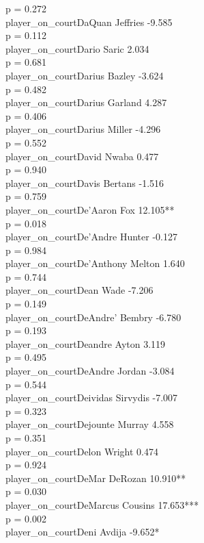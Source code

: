 \documentclass[
  landscape]{article}
\begin{document}
p = 0.272\\
player\_on\_courtDaQuan Jeffries -9.585\\
p = 0.112\\
player\_on\_courtDario Saric 2.034\\
p = 0.681\\
player\_on\_courtDarius Bazley -3.624\\
p = 0.482\\
player\_on\_courtDarius Garland 4.287\\
p = 0.406\\
player\_on\_courtDarius Miller -4.296\\
p = 0.552\\
player\_on\_courtDavid Nwaba 0.477\\
p = 0.940\\
player\_on\_courtDavis Bertans -1.516\\
p = 0.759\\
player\_on\_courtDe'Aaron Fox 12.105**\\
p = 0.018\\
player\_on\_courtDe'Andre Hunter -0.127\\
p = 0.984\\
player\_on\_courtDe'Anthony Melton 1.640\\
p = 0.744\\
player\_on\_courtDean Wade -7.206\\
p = 0.149\\
player\_on\_courtDeAndre' Bembry -6.780\\
p = 0.193\\
player\_on\_courtDeandre Ayton 3.119\\
p = 0.495\\
player\_on\_courtDeAndre Jordan -3.084\\
p = 0.544\\
player\_on\_courtDeividas Sirvydis -7.007\\
p = 0.323\\
player\_on\_courtDejounte Murray 4.558\\
p = 0.351\\
player\_on\_courtDelon Wright 0.474\\
p = 0.924\\
player\_on\_courtDeMar DeRozan 10.910**\\
p = 0.030\\
player\_on\_courtDeMarcus Cousins 17.653***\\
p = 0.002\\
player\_on\_courtDeni Avdija -9.652*\\
\end{document}
